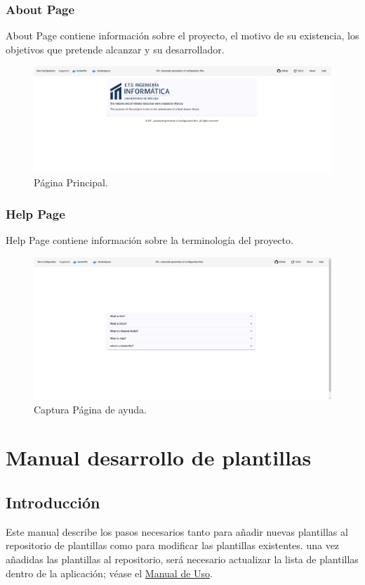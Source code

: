\documentclass[12pt, a4paper, twoside]{article}
\begin{document}
\begin{umaappendices}
	\subsubsection{About Page}
	About Page contiene información sobre el proyecto, el motivo de su existencia, los objetivos que pretende alcanzar y su desarrollador.
	\begin{figure}[h]
		\centering
			\includegraphics[width=1\textwidth]{Aboutpage.png}
		\caption{Página Principal.}
	\end{figure}

	\subsubsection{Help Page}
	Help Page contiene información sobre la terminología del proyecto. 
	\begin{figure}[h]
		\centering
			\includegraphics[width=1\textwidth]{HelpPage.png}
		\caption{Captura Página de ayuda.}
	\end{figure}




	\section{Manual desarrollo de plantillas}
	\label{sec:Manual de Desarrollo}
	\subsection{Introducción}
	Este manual describe los pasos necesarios tanto para añadir nuevas plantillas al repositorio de plantillas \cite{m4rdom_templates} como para modificar las plantillas existentes.
	una vez añadidas las plantillas al repositorio, será necesario actualizar la lista de plantillas dentro de la aplicación; véase el \hyperref[sec:Actualizar Plantillas]{Manual de Uso}.

\end{umaappendices}
\end{document}
